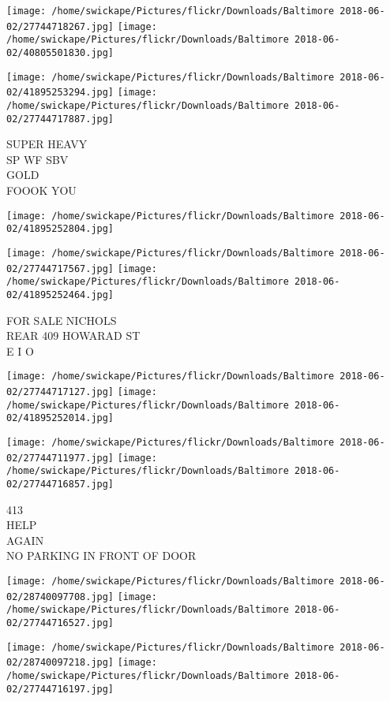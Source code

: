 \documentclass[10pt,letterpaper]{article}
\begin{document}
\texttt{[image: /home/swickape/Pictures/flickr/Downloads/Baltimore 2018-06-02/27744718267.jpg]}
\texttt{[image: /home/swickape/Pictures/flickr/Downloads/Baltimore 2018-06-02/40805501830.jpg]}

\texttt{[image: /home/swickape/Pictures/flickr/Downloads/Baltimore 2018-06-02/41895253294.jpg]}
\texttt{[image: /home/swickape/Pictures/flickr/Downloads/Baltimore 2018-06-02/27744717887.jpg]}

SUPER HEAVY\\
SP WF SBV\\
GOLD\\
FOOOK YOU\\
\pagebreak

\texttt{[image: /home/swickape/Pictures/flickr/Downloads/Baltimore 2018-06-02/41895252804.jpg]}

\vspace{0.25in}
\texttt{[image: /home/swickape/Pictures/flickr/Downloads/Baltimore 2018-06-02/27744717567.jpg]}
\texttt{[image: /home/swickape/Pictures/flickr/Downloads/Baltimore 2018-06-02/41895252464.jpg]}

FOR SALE NICHOLS\\
REAR 409 HOWARAD ST\\
E I O\\
\pagebreak

\texttt{[image: /home/swickape/Pictures/flickr/Downloads/Baltimore 2018-06-02/27744717127.jpg]}
\texttt{[image: /home/swickape/Pictures/flickr/Downloads/Baltimore 2018-06-02/41895252014.jpg]}

\texttt{[image: /home/swickape/Pictures/flickr/Downloads/Baltimore 2018-06-02/27744711977.jpg]}
\texttt{[image: /home/swickape/Pictures/flickr/Downloads/Baltimore 2018-06-02/27744716857.jpg]}

413\\
HELP\\
AGAIN\\
NO PARKING IN FRONT OF DOOR\\
\pagebreak

\texttt{[image: /home/swickape/Pictures/flickr/Downloads/Baltimore 2018-06-02/28740097708.jpg]}
\texttt{[image: /home/swickape/Pictures/flickr/Downloads/Baltimore 2018-06-02/27744716527.jpg]}

\texttt{[image: /home/swickape/Pictures/flickr/Downloads/Baltimore 2018-06-02/28740097218.jpg]}
\texttt{[image: /home/swickape/Pictures/flickr/Downloads/Baltimore 2018-06-02/27744716197.jpg]}
\end{document}
